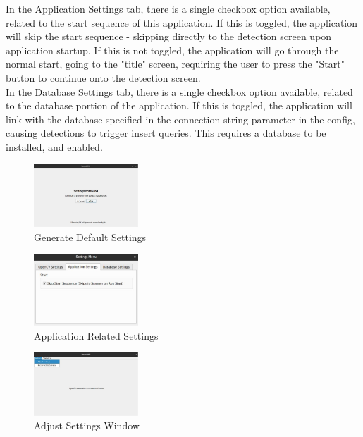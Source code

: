 \documentclass[conference]{IEEEtran}
\begin{document}
In the Application Settings tab, there is a single checkbox option available, related to the start sequence of this application. If this is toggled, the application will skip the start sequence - skipping directly to the detection screen upon application startup. If this is not toggled, the application will go through the normal start, going to the "title" screen, requiring the user to press the "Start" button to continue onto the detection screen.\\

In the Database Settings tab, there is a single checkbox option available, related to the database portion of the application. If this is toggled, the application will link with the database specified in the connection string parameter in the config, causing detections to trigger insert queries. This requires a database to be installed, and enabled.\\

\begin{figure}[h]
    \centering
    \includegraphics[width=0.35\textwidth]{images/settings_alert.eps}
    \caption{Generate Default Settings}
\end{figure}

\begin{figure}[h]
    \centering
    \includegraphics[width=0.35\textwidth]{images/app_settings.eps}
    \caption{Application Related Settings}
\end{figure}

\begin{figure}[h]
    \centering
    \includegraphics[width=0.35\textwidth]{images/adjust_settings.eps}
    \caption{Adjust Settings Window}
\end{figure}~\\
\end{document}
